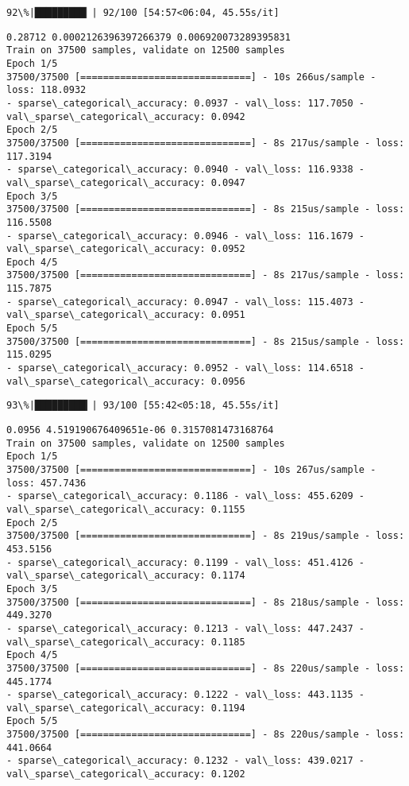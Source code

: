 \documentclass[11pt]{article}
\begin{document}
    \begin{Verbatim}[commandchars=\\\{\}]
 92\%|█████████▏| 92/100 [54:57<06:04, 45.55s/it]
    \end{Verbatim}

    \begin{Verbatim}[commandchars=\\\{\}]
0.28712 0.0002126396397266379 0.006920073289395831
Train on 37500 samples, validate on 12500 samples
Epoch 1/5
37500/37500 [==============================] - 10s 266us/sample - loss: 118.0932
- sparse\_categorical\_accuracy: 0.0937 - val\_loss: 117.7050 -
val\_sparse\_categorical\_accuracy: 0.0942
Epoch 2/5
37500/37500 [==============================] - 8s 217us/sample - loss: 117.3194
- sparse\_categorical\_accuracy: 0.0940 - val\_loss: 116.9338 -
val\_sparse\_categorical\_accuracy: 0.0947
Epoch 3/5
37500/37500 [==============================] - 8s 215us/sample - loss: 116.5508
- sparse\_categorical\_accuracy: 0.0946 - val\_loss: 116.1679 -
val\_sparse\_categorical\_accuracy: 0.0952
Epoch 4/5
37500/37500 [==============================] - 8s 217us/sample - loss: 115.7875
- sparse\_categorical\_accuracy: 0.0947 - val\_loss: 115.4073 -
val\_sparse\_categorical\_accuracy: 0.0951
Epoch 5/5
37500/37500 [==============================] - 8s 215us/sample - loss: 115.0295
- sparse\_categorical\_accuracy: 0.0952 - val\_loss: 114.6518 -
val\_sparse\_categorical\_accuracy: 0.0956
    \end{Verbatim}

    \begin{Verbatim}[commandchars=\\\{\}]
 93\%|█████████▎| 93/100 [55:42<05:18, 45.55s/it]
    \end{Verbatim}

    \begin{Verbatim}[commandchars=\\\{\}]
0.0956 4.519190676409651e-06 0.3157081473168764
Train on 37500 samples, validate on 12500 samples
Epoch 1/5
37500/37500 [==============================] - 10s 267us/sample - loss: 457.7436
- sparse\_categorical\_accuracy: 0.1186 - val\_loss: 455.6209 -
val\_sparse\_categorical\_accuracy: 0.1155
Epoch 2/5
37500/37500 [==============================] - 8s 219us/sample - loss: 453.5156
- sparse\_categorical\_accuracy: 0.1199 - val\_loss: 451.4126 -
val\_sparse\_categorical\_accuracy: 0.1174
Epoch 3/5
37500/37500 [==============================] - 8s 218us/sample - loss: 449.3270
- sparse\_categorical\_accuracy: 0.1213 - val\_loss: 447.2437 -
val\_sparse\_categorical\_accuracy: 0.1185
Epoch 4/5
37500/37500 [==============================] - 8s 220us/sample - loss: 445.1774
- sparse\_categorical\_accuracy: 0.1222 - val\_loss: 443.1135 -
val\_sparse\_categorical\_accuracy: 0.1194
Epoch 5/5
37500/37500 [==============================] - 8s 220us/sample - loss: 441.0664
- sparse\_categorical\_accuracy: 0.1232 - val\_loss: 439.0217 -
val\_sparse\_categorical\_accuracy: 0.1202
    \end{Verbatim}
\end{document}
